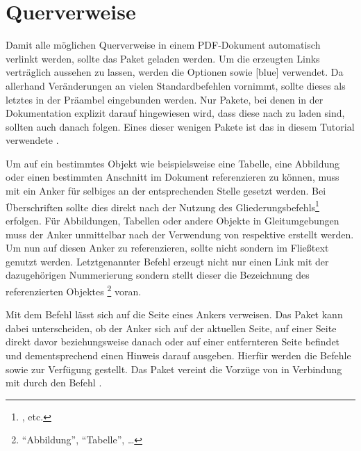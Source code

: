 \documentclass[%
  english,ngerman,%
  geometry=no,DIV=12,automark,%
]{tudscrartcl}
\begin{document}
\section{Querverweise}
\label{sec:references}
%
Damit alle möglichen Querverweise in einem PDF-Dokument automatisch verlinkt 
werden, sollte das Paket  geladen werden. Um die erzeugten 
Links verträglich aussehen zu lassen, werden die Optionen  
sowie [blue] verwendet. Da  allerhand 
Veränderungen an vielen Standardbefehlen vornimmt, sollte dieses als letztes in 
der Präambel eingebunden werden. Nur Pakete, bei denen in der Dokumentation 
explizit darauf hingewiesen wird, dass diese nach  zu laden 
sind, sollten auch danach folgen. Eines dieser wenigen Pakete ist das in diesem 
Tutorial verwendete . 
%
\begin{Preamble}
\usepackage[colorlinks,linkcolor=blue]{hyperref}

\end{Preamble}
%
Um auf ein bestimmtes Objekt wie beispielsweise eine Tabelle, eine Abbildung 
oder einen bestimmten Anschnitt im Dokument referenzieren zu können, muss mit 
 ein Anker für selbiges an der entsprechenden 
Stelle gesetzt werden. Bei Überschriften sollte dies direkt nach der Nutzung 
des Gliederungsbefehls\footnote{,  etc.} 
erfolgen. Für Abbildungen, Tabellen oder andere Objekte in Gleitumgebungen muss 
der Anker unmittelbar nach der Verwendung von  respektive 
 erstellt werden. Um nun auf diesen Anker zu referenzieren, 
sollte nicht  sondern  im Fließtext genutzt werden. 
Letztgenannter Befehl erzeugt nicht nur einen Link mit der dazugehörigen 
Nummerierung sondern stellt dieser die Bezeichnung des referenzierten Objektes%
\footnote{\enquote{Abbildung}, \enquote{Tabelle}, \dots} voran. 

Mit dem Befehl  lässt sich auf die Seite eines Ankers verweisen. 
Das Paket  kann dabei unterscheiden, ob der Anker sich auf 
der aktuellen Seite, auf einer Seite direkt davor beziehungsweise danach oder 
auf einer entfernteren Seite befindet und dementsprechend einen Hinweis darauf 
ausgeben. Hierfür werden die Befehle  sowie  zur 
Verfügung gestellt. Das Paket  vereint die Vorzüge von 
 in Verbindung mit  durch den Befehl .
\end{document}
